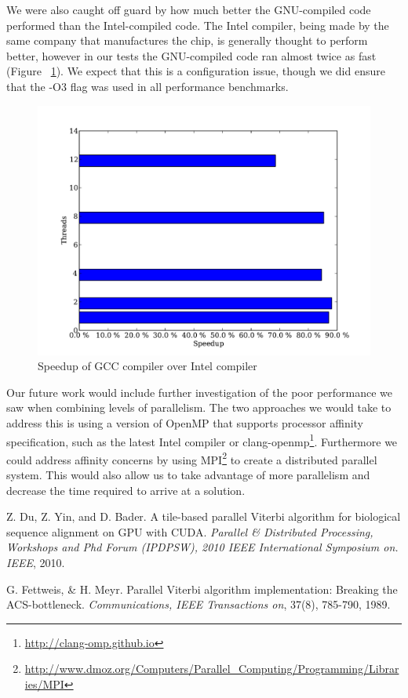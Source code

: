\documentclass[11pt,onecolumn]{article}
\begin{document}
We were also caught off guard by how much better the GNU-compiled code performed than the Intel-compiled code. The Intel compiler, being made by the same company that manufactures the chip, is generally thought to perform better, however in our tests the GNU-compiled code ran almost twice as fast (Figure ~\ref{fig:gccvsintel}). We expect that this is a configuration issue, though we did ensure that the -O3 flag was used in all performance benchmarks.

\begin{figure}[h!]
\centering
\includegraphics[width=.75\linewidth]{figures/comparison_of_intel_and_gnu_comiler_performance}
\caption{Speedup of GCC compiler over Intel compiler}
\label{fig:gccvsintel}
\end{figure}


Our future work would include further investigation of the poor performance we saw when combining levels of parallelism. The two approaches we would take to address this is using a version of OpenMP that supports processor affinity specification, such as the latest Intel compiler or clang-openmp\footnote{\url{http://clang-omp.github.io}}. Furthermore we could address affinity concerns by using MPI\footnote{\url{http://www.dmoz.org/Computers/Parallel_Computing/Programming/Libraries/MPI}} to create a distributed parallel system. This would also allow us to take advantage of more parallelism and decrease the time required to arrive at a solution.


\begin{thebibliography}{1}
\small

Z. Du, Z. Yin, and D. Bader. A tile-based parallel Viterbi algorithm for biological sequence alignment on GPU with CUDA. \emph{Parallel \& Distributed Processing, Workshops and Phd Forum (IPDPSW), 2010 IEEE International Symposium on. IEEE}, 2010.

G. Fettweis, \& H. Meyr. Parallel Viterbi algorithm implementation: Breaking the ACS-bottleneck. \emph{Communications, IEEE Transactions on}, 37(8), 785-790,  1989.


\end{thebibliography}
\end{document}
